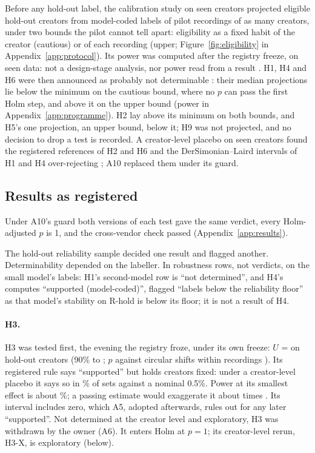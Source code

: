Before any hold-out label, the calibration study on seen creators projected eligible hold-out creators from
model-coded labels of \PilotWRecordings{} pilot recordings of as many creators, under two bounds the pilot cannot tell
apart: eligibility as a fixed habit of the creator (cautious) or of each recording (upper; Figure~\ref{fig:eligibility}
in Appendix~\ref{app:protocol}). Its power was computed after the registry freeze, on seen data: not a design-stage
analysis, nor power read from a result \cite{hoenig2001abuse}. H1, H4 and H6 were then announced as probably not
determinable \cite{card2020little}: their median projections lie below the minimum on the cautious bound, where no $p$
can pass the first Holm step, and above it on the upper bound (power in Appendix~\ref{app:programme}). H2 lay above
its minimum on both bounds, and H5's one projection, an upper bound, below it; H9 was not projected, and no decision to drop a test
is recorded. A creator-level placebo on seen creators \cite{lipsitch2010negative} found the registered references of
H2 and H6 and the DerSimonian--Laird intervals of H1 and H4 over-rejecting \cite{mackinnon2022clusterrobust}; A10
replaced them under its guard.

\subsection{Results as registered}
\label{sec:results}

\ResSummary{} \ResCounts{} Under A10's guard both versions of each test gave the same verdict, every Holm-adjusted
$p$ is 1, and the cross-vendor check passed (Appendix~\ref{app:results}).

The hold-out reliability sample decided one result and flagged another. \ResRholdGates{} Determinability depended on the
labeller. In robustness rows, not verdicts, on the small model's labels: H1's second-model row is ``not determined'',
and H4's computes ``supported (model-coded)'', flagged ``labels below the reliability floor'' as that model's stability
on R-hold is below its floor; it is not a result of H4.

\paragraph{H3.}
\label{sec:hthree}
H3 was tested first, the evening the registry froze, under its own freeze: $U$ = \HThreeU{} on \HThreeCreators{}
hold-out creators (90\% \HThreeRegLo{} to \HThreeRegHi; $p$ against circular shifts within recordings \HThreeShiftP).
Its registered rule says ``supported'' but holds creators fixed: under a creator-level placebo it says so in
\HThreePlaceboSeventeen\% of sets against a nominal 0.5\%. Power at its smallest effect is about
\HThreePowerSeventeen\%; a passing estimate would exaggerate it about \HThreeTypeM{} times \cite{gelman2014beyond}. Its
interval includes zero, which A5, adopted afterwards, rules out for any later ``supported''. Not determined at the
creator level and exploratory, H3 was withdrawn by the owner (A6). It enters Holm at $p = 1$; its creator-level rerun,
H3-X, is exploratory (below).

